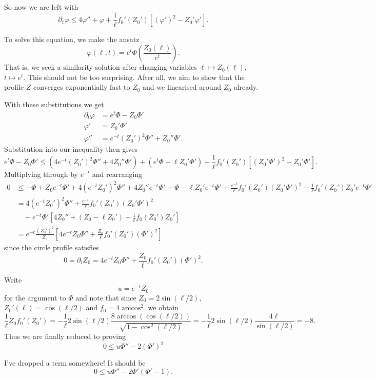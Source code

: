\documentclass{amsart}
\begin{document}
So now we are left with
\[
\partial_t \varphi \leq 4 \varphi'' + \varphi + \frac{1}{\ell} f_0'(Z_0')[(\varphi')^2 - Z_0'\varphi'].
\]

To solve this equation, we make the ansatz
\[
\varphi(\ell, t) = e^t \Phi\left(\frac{Z_0(\ell)}{e^t}\right).
\]
That is, we seek a similarity solution after changing variables \(\ell \mapsto Z_0(\ell)\), \(t \mapsto e^t\). This should not be too surprising. After all, we aim to show that the profile \(Z\) converges exponentially fast to \(Z_0\) and we linearised around \(Z_0\) already.

With these substitutions we get
\begin{align*}
\partial_t \varphi &= e^t \Phi - Z_0 \Phi' \\
\varphi' &= Z_0' \Phi' \\
\varphi'' &= e^{-t} (Z_0')^2 \Phi'' + Z_0'' \Phi'.
\end{align*}
Substitution into our inequality then gives
\[
e^t \Phi - Z_0 \Phi' \leq (4 e^{-t} (Z_0')^2 \Phi'' + 4 Z_0'' \Phi') + (e^t \Phi - \ell Z_0' \Phi') + \frac{1}{\ell} f_0'(Z_0')[(Z_0' \Phi')^2 - Z_0'\Phi'].
\]
Multiplying through by \(e^{-t}\) and rearranging
\[
\begin{split}
0 &\leq -\Phi + Z_0 e^{-t} \Phi' + 4 (e^{-t} Z_0')^2 \Phi'' + 4 Z_0'' e^{-t} \Phi' + \Phi - \ell Z_0' e^{-t}\Phi'+ \frac{e^{-t}}{\ell} f_0'(Z_0')(Z_0' \Phi')^2 - \frac{1}{\ell} f_0'(Z_0') Z_0' e^{-t} \Phi' \\
&= 4 (e^{-t} Z_0')^2 \Phi'' + \frac{e^{-t}}{\ell} f_0'(Z_0') (Z_0' \Phi')^2 \\
&\quad + e^{-t}\Phi'\left[4Z_0'' + (Z_0 - \ell Z_0') - \frac{1}{\ell} f_0(Z_0') Z_0'\right] \\
&= e^{-t} \frac{(Z_0')^2}{Z_0} \left[4e^{-t}Z_0 \Phi'' + \frac{Z_0}{\ell} f_0'(Z_0') (\Phi')^2\right]
\end{split}
\]
since the circle profile satisfies
\[
0 = \partial_t Z_0 = 4e^{-t}Z_0 \Phi'' + \frac{Z_0}{\ell} f_0'(Z_0') (\Phi')^2.
\]

Write
\[
u = e^{-t} Z_0
\]
for the argument to \(\Phi\) and note that since \(Z_0 = 2 \sin(\ell/2)\), \(Z_0'(\ell) = \cos(\ell/2)\) and \(f_0 = 4 \arccos^2\) we obtain
\[
\frac{1}{\ell} Z_0 f_0'(Z_0') = - \frac{1}{\ell} 2 \sin(\ell/2) \frac{8\arccos(\cos(\ell/2))}{\sqrt{1 - \cos^2(\ell/2)}} = - \frac{1}{\ell} 2 \sin(\ell/2) \frac{4\ell}{\sin(\ell/2)} = -8.
\]
Thus we are finally reduced to proving
\[
0 \leq u \Phi'' - 2 (\Phi')^2
\]

I've dropped a term somewhere! It should be
\[
0 \leq u \Phi'' - 2 \Phi'(\Phi' - 1).
\]
\end{document}
